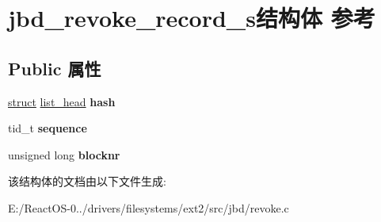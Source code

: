 \hypertarget{structjbd__revoke__record__s}{}\section{jbd\+\_\+revoke\+\_\+record\+\_\+s结构体 参考}
\label{structjbd__revoke__record__s}
\subsection*{Public 属性}
\begin{DoxyCompactItemize}
\item 
\mbox{\label{structjbd__revoke__record__s_afcd2f07cabf01f4bc08de4901ec62045}} 
\hyperlink{interfacestruct}{struct} \hyperlink{structlist__head}{list\+\_\+head} {\bfseries hash}
\item 
\mbox{\label{structjbd__revoke__record__s_ab7e7995d1664210ae4c0c73123ab1613}} 
tid\+\_\+t {\bfseries sequence}
\item 
\mbox{\label{structjbd__revoke__record__s_af451ae5b5cd60c0048f56ffed67cb9b0}} 
unsigned long {\bfseries blocknr}
\end{DoxyCompactItemize}


该结构体的文档由以下文件生成\+:\begin{DoxyCompactItemize}
\item 
E\+:/\+React\+O\+S-\/0../drivers/filesystems/ext2/src/jbd/revoke.\+c\end{DoxyCompactItemize}
